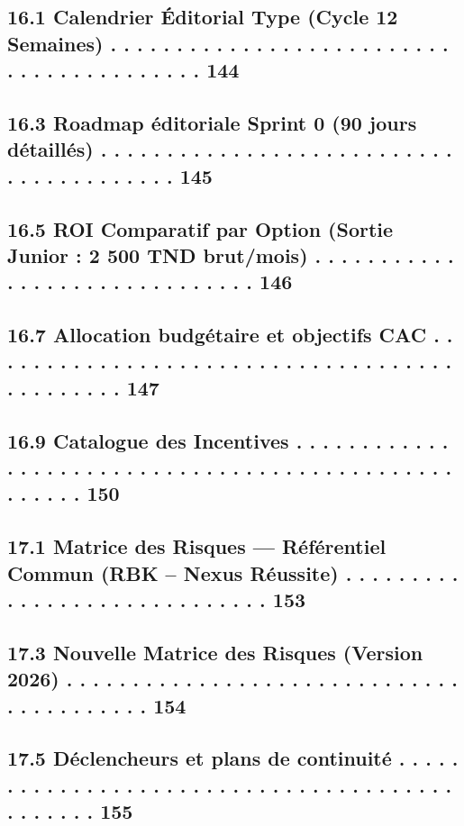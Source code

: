 \subsection{16.1 Calendrier Éditorial Type (Cycle 12 Semaines) . . . . . . . . . . . . . . . . . . . . . . . . . . . . . . . . . . . . . . . . . 144}
\subsection{16.3 Roadmap éditoriale Sprint 0 (90 jours détaillés) . . . . . . . . . . . . . . . . . . . . . . . . . . . . . . . . . . . . . . . . 145}
\subsection{16.5 ROI Comparatif par Option (Sortie Junior : 2 500 TND brut/mois) . . . . . . . . . . . . . . . . . . . . . . . . . . . . . . 146}
\subsection{16.7 Allocation budgétaire et objectifs CAC . . . . . . . . . . . . . . . . . . . . . . . . . . . . . . . . . . . . . . . . . . . . . 147}
\subsection{16.9 Catalogue des Incentives . . . . . . . . . . . . . . . . . . . . . . . . . . . . . . . . . . . . . . . . . . . . . . . . . . . . 150}
\vspace{0.5em}
\subsection{17.1 Matrice des Risques — Référentiel Commun (RBK – Nexus Réussite) . . . . . . . . . . . . . . . . . . . . . . . . . . . . . 153}
\subsection{17.3 Nouvelle Matrice des Risques (Version 2026) . . . . . . . . . . . . . . . . . . . . . . . . . . . . . . . . . . . . . . . . . 154}
\subsection{17.5 Déclencheurs et plans de continuité . . . . . . . . . . . . . . . . . . . . . . . . . . . . . . . . . . . . . . . . . . . . . . 155}
